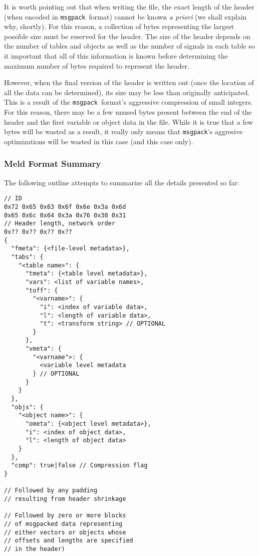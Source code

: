 \documentclass[11pt,a4paper,twocolumn]{article}
\newcommand{\msgpack}{\texttt{msgpack}}
\begin{document}
It is worth pointing out that when writing the file, the exact length
of the header (when encoded in \msgpack\ format) cannot be known
\textit{a priori} (we shall explain why, shortly).  For this reason, a
collection of bytes representing the largest possible size must be
reserved for the header.  The size of the header depends on the number
of tables and objects as well as the number of signals in each table
so it important that all of this information is known before
determining the maximum number of bytes required to represent the
header.

However, when the final version of the header is written out (once the
location of all the data can be determined), its size may be less than
originally anticipated.  This is a result of the \msgpack\ format's
aggressive compression of small integers.  For this reason, there may
be a few unused bytes present between the end of the header and the
first variable or object data in the file.  While it is true that a
few bytes will be wasted as a result, it really only means that
\msgpack's aggresive optimizations will be wasted in this case (and
this case only).

\subsubsection{Meld Format Summary}

The following outline attempts to summarize all the details presented so
far:
{\small
\begin{verbatim}
// ID
0x72 0x65 0x63 0x6f 0x6e 0x3a 0x6d
0x65 0x6c 0x64 0x3a 0x76 0x30 0x31
// Header length, network order
0x?? 0x?? 0x?? 0x??
{
  "fmeta": {<file-level metadata>},
  "tabs": {
    "<table name>": {
      "tmeta": {<table level metadata>},
      "vars": <list of variable names>,
      "toff": {
        "<varname>": {
          "i": <index of variable data>,
          "l": <length of variable data>,
          "t": <transform string> // OPTIONAL
        }
      },
      "vmeta": {
        "<varname">: {
          <variable level metadata
        } // OPTIONAL
      }
    }
  },
  "objs": {
    "<object name>": {
      "ometa": {<object level metadata>},
      "i": <index of object data>,
      "l": <length of object data>
    }
  },
  "comp": true|false // Compression flag
}

// Followed by any padding
// resulting from header shrinkage

// Followed by zero or more blocks
// of msgpacked data representing
// either vectors or objects whose
// offsets and lengths are specified
// in the header)
\end{verbatim}
}
\end{document}
